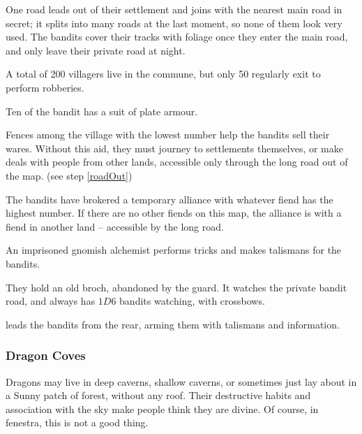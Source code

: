 \begin{multicols}{2}
One road leads out of their settlement and joins with the nearest main road in secret; it splits into many roads at the last moment, so none of them look very used.
The bandits cover their tracks with foliage once they enter the main road, and only leave their private road at night.

A total of 200 villagers live in the commune, but only 50 regularly exit to perform robberies.

\begin{dlist}
  \item
  Ten of the bandit has a suit of plate armour.
  \item
  Fences among the \gls{village} with the lowest number help the bandits sell their wares.
  Without this aid, they must journey to settlements themselves, or make deals with people from other lands, accessible only through the long road out of the map.
  (see step \vref{roadOut})
  \item
  The bandits have brokered a temporary alliance with whatever fiend has the highest number.
  If there are no other fiends on this map, the alliance is with a fiend in another land -- accessible by the long road.
  \item
  An imprisoned gnomish alchemist performs tricks and makes \glspl{talisman} for the bandits.
  \item
  They hold an old \gls{broch}, abandoned by the \gls{guard}.
  It watches the private bandit road, and always has $1D6$ bandits watching, with crossbows.
  \item
   leads the bandits from the rear, arming them with \glspl{talisman} and information.
\end{dlist}

\subsubsection{Dragon Coves}
\label{dragonPoint}

Dragons may live in deep caverns, shallow caverns, or sometimes just lay about in a Sunny patch of forest, without any roof.
Their destructive habits and association with the sky make people think they are divine.
Of course, in \gls{fenestra}, this is not a good thing.


\end{multicols}
